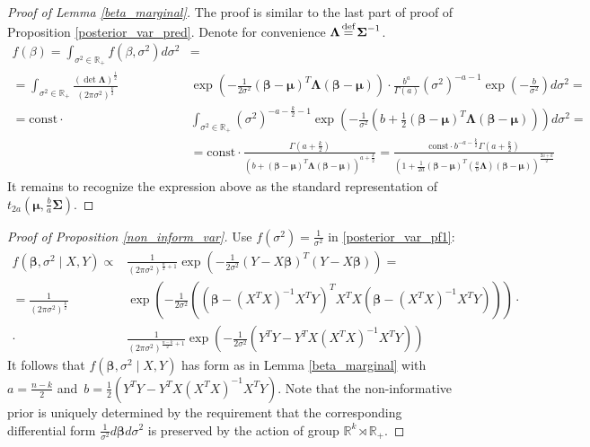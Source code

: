 \documentclass[10pt,fleqn]{amsart}
\theoremstyle{definition}
\theoremstyle{remark}
\numberwithin{equation}{section}
\newcommand{\RR}{\mathbb{R}}
\newcommand{\eq}{\stackrel{\mathclap{\normalfont\text{def}}}{=}}
\newcommand{\const}{\text{const}}
\newcommand{\bbeta}{\boldsymbol{\beta}}
\newcommand{\mmu}{\boldsymbol{\mu}}
\newcommand{\SSigma}{\boldsymbol{\Sigma}}
\newcommand{\LLambda}{\boldsymbol{\Lambda}}
\newcommand{\XTX}{X^TX}
\newcommand{\XTY}{X^TY}
\newcommand{\XTXi}{\left(X^TX\right)^{-1}}
\begin{document}
\begin{proof}[Proof of Lemma \ref{beta_marginal}]
The proof is similar to the last part of proof of Proposition \ref{posterior_var_pred}. Denote for convenience $\LLambda\eq\SSigma^{-1}$.
\begin{equation*}
    \begin{split}
        f(\beta)=\int_{\sigma^2\in\RR_+}f\left(\beta,\sigma^2\right)d\sigma^2&=\\
        =\int_{\sigma^2\in\RR_+}\frac{\left(\det\LLambda\right)^{\frac 12}}{\left(2\pi\sigma^2\right)^{\frac k2}}&
        \exp\left(-\frac 1{2\sigma^2}(\bbeta-\mmu)^T\LLambda(\bbeta-\mmu)\right)\cdot\frac{{b}^{a}}
        {\Gamma(a)}\left(\sigma^2\right)^{-a-1}\exp\left(-\frac{b}{\sigma^2}\right)d\sigma^2=\\
        =\const\cdot&\int_{\sigma^2\in\RR_+}\left(\sigma^2\right)^{-a-\frac k 2 -1}\exp\left(-\frac 1{\sigma^2}
        \left(b+\frac 12(\bbeta-\mmu)^T\LLambda(\bbeta-\mmu)\right)\right)d\sigma^2=\\
        &=\const\cdot \frac{\Gamma{\left(a+\frac k 2\right)}}{\left(b+(\bbeta-\mmu)^T\LLambda(\bbeta-\mmu)\right)^{a+\frac k 2}}=
        \frac{\const \cdot b^{-a-\frac k2}\Gamma{\left(a+\frac k 2\right)}}{\left(1+\frac 1{2a}(\bbeta-\mmu)^T\left(\frac ab\LLambda\right)(\bbeta-\mmu)\right)^{\frac {2a+k}2}}
    \end{split}
\end{equation*}
It remains to recognize the expression above as the standard representation of $t_{2a}\left(\mmu,\frac ba\SSigma\right)$.
\end{proof}
\begin{proof}[Proof of Proposition \ref{non_inform_var}]
Use $\displaystyle f(\sigma^2)=\frac 1 {\sigma^2}$ in \ref{posterior_var_pf1}:
\begin{equation*}
    \begin{split}
        f\left(\bbeta,\sigma^2\mid X,Y\right)\propto&\frac 1{\left(2\pi\sigma^2\right)^{\frac n 2+1}}
        \exp\left(-\frac 1{2\sigma^2}\left(Y-X\bbeta\right)^T\left(Y-X\bbeta\right)\right)=\\        
        =\frac 1{\left(2\pi\sigma^2\right)^{\frac k 2}}&
        \exp\left(-\frac 1{2\sigma^2}\left(\left(\bbeta-\XTXi\XTY\right)^T\XTX\left(\bbeta-\XTXi\XTY\right)\right)\right)\cdot \\
        \cdot&\frac 1{\left(2\pi\sigma^2\right)^{\frac {n-k}2+1}}
        \exp{\left(-\frac 1 {2\sigma^2}\left(Y^TY-Y^TX\XTXi\XTY \right)\right)}
    \end{split}
\end{equation*}
It follows that $f\left(\bbeta,\sigma^2\mid X,Y\right)$ has form as in Lemma \ref{beta_marginal}
with $\displaystyle a=\frac{n-k}2$ and~$\displaystyle b=\frac 12 \left(Y^TY-Y^TX\XTXi\XTY \right)$.
Note that the non-informative prior is uniquely determined by the requirement that the corresponding differential form
$\displaystyle \frac 1{\sigma^2}d\bbeta d\sigma^2$ is preserved by the action of group $\RR^k\rtimes \RR_+$.
\end{proof}
\end{document}
